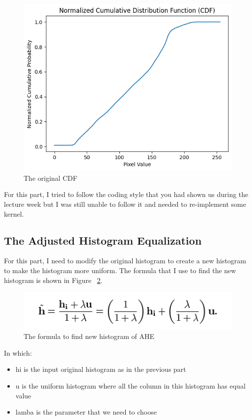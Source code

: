 \documentclass{article}
\begin{document}
	\begin{figure}
		\includegraphics[width=\linewidth]{img/original_cdf.png}
		\caption{The original CDF}
		\label{fig:original_cdf}
	\end{figure}
	
	For this part, I tried to follow the coding style that you had shown us during the lecture week but I was still unable to follow it and needed to re-implement some kernel.
	
	\subsection{The Adjusted Histogram Equalization}
	
	For this part, I need to modify the original histogram to create a new histogram to make the histogram more uniform. The formula that I use to find the new histogram is shown in Figure ~\ref{fig:AHE_formula}.
	
	\begin{figure}[!h]
		\includegraphics[width=\linewidth]{img/AHE_formula.PNG}
		\caption{The formula to find new histogram of AHE}
		\label{fig:AHE_formula}
	\end{figure}
	
	In which:
	\begin{itemize}
		\item hi is the input original histogram as in the previous part
		\item u is the uniform histogram where all the column in this histogram has equal value
		\item lamba is the parameter that we need to choose
	\end{itemize}
	
\end{document}

